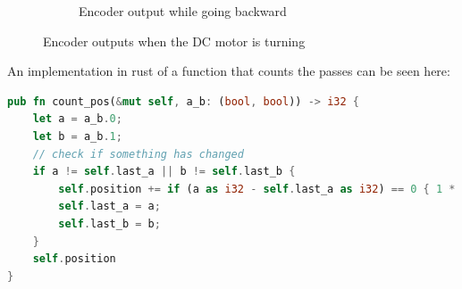 \begin{center}
\begin{figure}[H]
\begin{subfigure}{.5\textwidth}
            \caption[encoder-backward]{Encoder output while going backward}
            \label{fig:encoder-backward}
        \end{subfigure}
        \caption{Encoder outputs when the DC motor is turning}
        \label{fig:encoder}
    \end{figure}
\end{center}
An implementation in rust of a function that counts the passes can be seen here:
\begin{lstlisting}[language=rust,breaklines,label={lst:dc-motor}]
pub fn count_pos(&mut self, a_b: (bool, bool)) -> i32 {
    let a = a_b.0;
    let b = a_b.1;
    // check if something has changed
    if a != self.last_a || b != self.last_b {
        self.position += if (a as i32 - self.last_a as i32) == 0 { 1 * if a { 1 } else { -1 } * if (b as i32 - self.last_b as i32) == 1 { 1 } else { -1 } } else { - (1 * if b { 1 } else { -1 } * (a as i32 - self.last_a as i32))};
        self.last_a = a;
        self.last_b = b;
    }
    self.position
}

\end{lstlisting}


